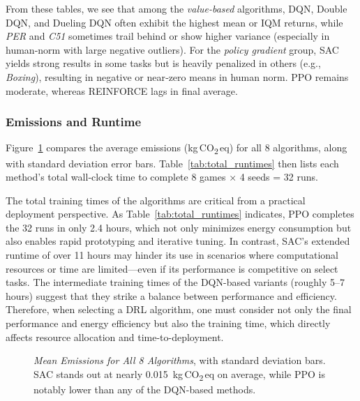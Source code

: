 From these tables, we see that among the \emph{value-based} algorithms, 
DQN, Double DQN, and Dueling DQN often exhibit the highest mean or IQM returns, while 
\emph{PER} and \emph{C51} sometimes trail behind or show higher variance (especially in 
human‐norm with large negative outliers). For the \emph{policy gradient} group, SAC yields strong 
results in some tasks but is heavily penalized in others (e.g., \emph{Boxing}), resulting 
in negative or near‐zero means in human norm. PPO remains moderate, whereas REINFORCE 
lags in final average.

\subsubsection{Emissions and Runtime}

Figure~\ref{fig:barplot_emissions_total} compares the average emissions (kg\,CO\textsubscript{2}\,eq) for 
all 8 algorithms, along with standard deviation error bars. Table~\ref{tab:total_runtimes} 
then lists each method's total wall‐clock time to complete 8 games × 4 seeds = 32 runs.

The total training times of the algorithms are critical from a practical deployment perspective. As Table~\ref{tab:total_runtimes} indicates, PPO completes the 32 runs in only 2.4 hours, which not only minimizes energy consumption but also enables rapid prototyping and iterative tuning. In contrast, SAC's extended runtime of over 11 hours may hinder its use in scenarios where computational resources or time are limited—even if its performance is competitive on select tasks. The intermediate training times of the DQN-based variants (roughly 5–7 hours) suggest that they strike a balance between performance and efficiency. Therefore, when selecting a DRL algorithm, one must consider not only the final performance and energy efficiency but also the training time, which directly affects resource allocation and time-to-deployment.

\begin{figure} 
	\centering
	
	\caption{\emph{Mean Emissions for All 8 Algorithms}, with standard deviation bars.
		SAC stands out at nearly 0.015~kg\,CO\textsubscript{2}\,eq on average, while PPO is notably lower than
		any of the DQN-based methods.}
	\label{fig:barplot_emissions_total}
\end{figure}

